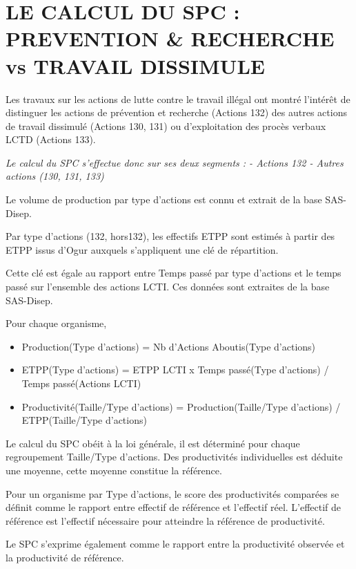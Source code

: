 \documentclass[
]{book}
\begin{document}
\hypertarget{le-calcul-du-spc-prevention-recherche-vs-travail-dissimule}{%
\section{LE CALCUL DU SPC : PREVENTION \& RECHERCHE vs TRAVAIL DISSIMULE}\label{le-calcul-du-spc-prevention-recherche-vs-travail-dissimule}}

Les travaux sur les actions de lutte contre le travail illégal ont montré l'intérêt de distinguer les actions de prévention et recherche (Actions 132) des autres actions de travail dissimulé (Actions 130, 131) ou d'exploitation des procès verbaux LCTD (Actions 133).

\emph{Le calcul du SPC s'effectue donc sur ses deux segments :
- Actions 132
- Autres actions (130, 131, 133)}

Le volume de production par type d'actions est connu et extrait de la base SAS-Disep.

Par type d'actions (132, hors132), les effectifs ETPP sont estimés à partir des ETPP issus d'Ogur auxquels s'appliquent une clé de répartition.

Cette clé est égale au rapport entre Temps passé par type d'actions et le temps passé sur l'ensemble des actions LCTI. Ces données sont extraites de la base SAS-Disep.

Pour chaque organisme,

\begin{itemize}
\item
  Production(Type d'actions) = Nb d'Actions Aboutis(Type d'actions)
\item
  ETPP(Type d'actions) = ETPP LCTI x Temps passé(Type d'actions) / Temps passé(Actions LCTI)
\item
  Productivité(Taille/Type d'actions) = Production(Taille/Type d'actions) / ETPP(Taille/Type d'actions)
\end{itemize}

Le calcul du SPC obéit à la loi générale, il est déterminé pour chaque regroupement Taille/Type d'actions. Des productivités individuelles est déduite une moyenne, cette moyenne constitue la référence.

Pour un organisme par Type d'actions, le score des productivités comparées se définit comme le rapport entre effectif de référence et l'effectif réel. L'effectif de référence est l'effectif nécessaire pour atteindre la référence de productivité.

Le SPC s'exprime également comme le rapport entre la productivité observée et la productivité de référence.
\end{document}
